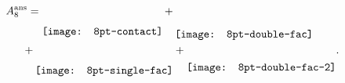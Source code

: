 \documentclass{standalone}
\begin{document}
$
 \begin{aligned}
 	A_8^{\text{ans}}=\raisebox{-6.5mm}{\texttt{[image: 8pt-contact]}}\,+&\,\raisebox{-7.4mm}{\texttt{[image: 8pt-double-fac]}}\\
 	+\,\raisebox{-6.5mm}{\texttt{[image: 8pt-single-fac]}}&+\raisebox{-5.5mm}{\texttt{[image: 8pt-double-fac-2]}}.\label{Ans8pt}\\
 \end{aligned}
$
\end{document}
